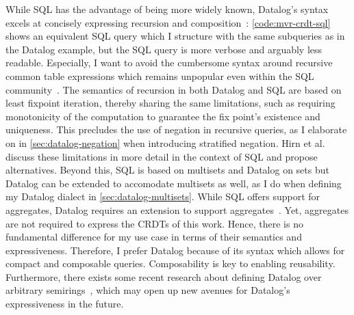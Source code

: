 While SQL has the advantage of being more widely known,
Datalog's syntax excels at concisely expressing recursion and
composition~\cite{abo2024convergence}:
\ref{code:mvr-crdt-sql} shows an equivalent SQL query which I structure
with the same subqueries as in the Datalog example,
but the SQL query is more verbose and arguably less readable.
Especially, I want to avoid the cumbersome syntax around recursive
common table expressions which remains unpopular even within the SQL
community~\cite{neumann2024critique, hirn2023fix, mcsherry2022recursion}.
The semantics of recursion in both Datalog and SQL are based on least
fixpoint iteration, thereby sharing the same limitations, such as requiring
monotonicity of the computation to guarantee the fix point's existence
and uniqueness. This precludes the use of negation in recursive queries,
as I elaborate on in \ref{sec:datalog-negation} when introducing stratified
negation.
Hirn et al. \cite{hirn2023fix} discuss these limitations in more detail
in the context of SQL and propose alternatives.
Beyond this, SQL is based on multisets and Datalog on sets but Datalog can
be extended to accomodate multisets as well, as I do when defining
my Datalog dialect in \ref{sec:datalog-multisets}.
While SQL offers support for aggregates,
Datalog requires an extension to support aggregates~\cite{green2013datalog}.
Yet, aggregates are not required to express the \acp{CRDT} of this work.
Hence, there is no fundamental difference for my use case
in terms of their semantics and expressiveness.
Therefore, I prefer Datalog because of its syntax which allows for compact
and composable queries. Composability is key to enabling reusability.
Furthermore, there exists some recent research about defining Datalog
over arbitrary semirings~\cite{abo2024convergence, khamis2022datalog},
which may open up new avenues for Datalog's expressiveness in the future.

